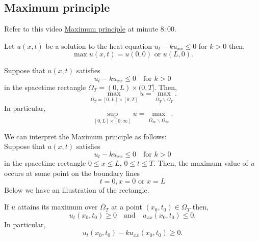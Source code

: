 \documentclass[12pt, a4paper]{article}
\begin{document}
\subsection{Maximum principle}

\begin{mdnote}
    Refer to this video \href{https://www.youtube.com/watch?v=nDpwwEBj4ME}{Maximum principle} at minute \(8:00\).
\end{mdnote}

\begin{mdnote}
    Let \(u(x,t)\) be a solution to the heat equation \(u_t-ku_{xx}\leq 0\) for \(k>0\) then, 
    \[\max u(x,t) = u(0,0) \text{ or } u(L,0).\]
\end{mdnote}

\begin{mdthm}
    Suppose that \(u(x,t)\) satisfies 
    \[u_t -ku_{xx} \leq 0 \quad \text{for } k>0\]
    in the spacetime rectangle \(\Omega_T = (0,L) \times (0,T]\).
    Then,
    \[\max_{\overline{\Omega}_T = [0,L]\times[0,T]} u = \max_{\overline{\Omega}_T \backslash \Omega_T}.\]
    In particular,
    \[\sup_{[0,L]\times[0,\infty]} u = \max_{\overline{\Omega}_{\infty} \backslash \Omega_{\infty}}.\]
\end{mdthm}

\begin{mdnote}
    We can interpret the Maximum principle as follows: \\
    Suppose that \(u(x,t)\) satisfies 
    \[u_t -ku_{xx} \leq 0 \quad \text{for } k>0\]
    in the spacetime rectangle \(0 \leq x \leq L\), \(0 \leq t \leq T\). Then, the maximum value of \(u\) occurs at some point on the boundary lines 
    \[t=0, x=0 \text{ or } x=L \]
    Below we have an illustration of the rectangle.
    \begin{figure}[H]
         \begin{center}
             
         \end{center}
    \end{figure}
\end{mdnote}

\begin{lemma}
    If \(u\) attains its maximum over \(\overline{\Omega}_T\) at a point \((x_0,t_0) \in \Omega_T\) then,
    \[u_t(x_0,t_0) \geq 0 \quad \text{and} \quad u_{xx}(x_0,t_0) \leq 0.\]
    In particular, 
    \[u_t(x_0,t_0)-ku_{xx}(x_0,t_0) \geq 0.\]
\end{lemma}
\end{document}
